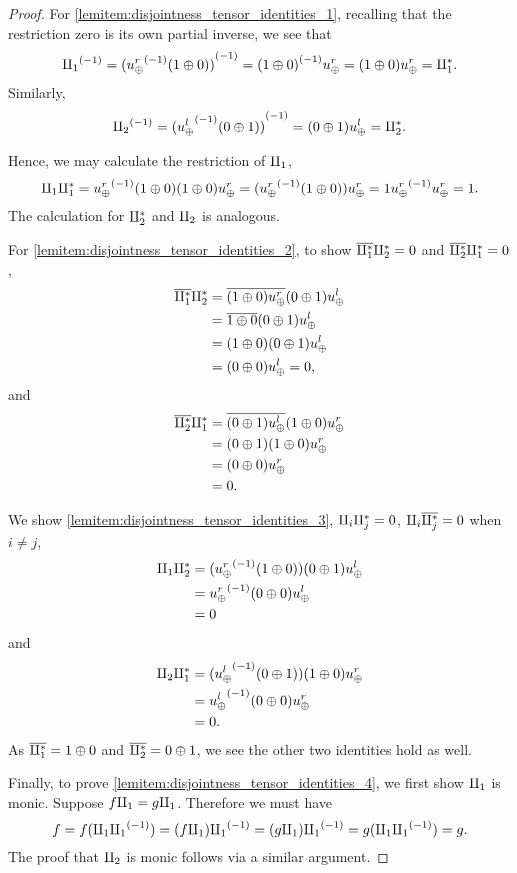 \begin{proof}
  For \ref{lemitem:disjointness_tensor_identities_1}, recalling that the restriction zero is its own
  partial inverse, we see that
  \[
    {\amalg_{1}}^{(-1)} = {({u_{\oplus}^r}^{(-1)}(1\oplus0))}^{(-1)}  = {(1\oplus0)}^{(-1)}u_{\oplus}^r = (1\oplus0)u_{\oplus}^r = \amalg_{1}^{*}.
  \]
  Similarly,
  \[
    {\amalg_{2}}^{(-1)} = {({u_{\oplus}^l}^{(-1)}(0\oplus1))}^{(-1)} = (0\oplus1)u_{\oplus}^l = \amalg_{2}^{*}.
  \]

  Hence, we may calculate the restriction of $\amalg_{1}$,
  \begin{equation*}
    \amalg_{1} \amalg_{1}^{*}   = {u_{\oplus}^r}^{(-1)}(1\oplus0) (1\oplus0)u_{\oplus}^r
      = ({u_{\oplus}^r}^{(-1)}(1\oplus0))u_{\oplus}^r = 1 {u_{\oplus}^r}^{(-1)}u_{\oplus}^r= 1.
  \end{equation*}
  The calculation for $\amalg_{2}^{*}$ and $\amalg_{2}$ is analogous.

  For \ref{lemitem:disjointness_tensor_identities_2}, to show $\overline{\amalg_{1}^{*}} \amalg_{2}^{*} = 0$ and
  $\overline{\amalg_{2}^{*}} \amalg_{1}^{*} = 0$,
  \begin{align*}
    \overline{\amalg_{1}^{*}} \amalg_{2}^{*}  &= \overline{(1\oplus0)u_{\oplus}^r}(0\oplus1)u_{\oplus}^l\\
      &= \overline{1\oplus0} (0 \oplus 1)u_{\oplus}^l\\
      &= (1\oplus0) (0\oplus1)u_{\oplus}^l\\
      &= (0\oplus0)u_{\oplus}^l  = 0,
  \end{align*}
  and
  \begin{align*}
    \overline{\amalg_{2}^{*}} \amalg_{1}^{*}  &= \overline{(0\oplus1)u_{\oplus}^l}(1\oplus0)u_{\oplus}^r \\
     &= (0\oplus1) (1\oplus0)u_{\oplus}^r\\
     &= (0\oplus0)u_{\oplus}^r\\
     &= 0.
 \end{align*}

  We show \ref{lemitem:disjointness_tensor_identities_3}, $\amalg_{i} \amalg_{j}^{*} = 0$, $\amalg_{i}
  \overline{\amalg_{j}^{*}} = 0$ when $i\ne j$,
  \begin{align*}
    \amalg_{1} \amalg_{2}^{*} &= ({u_{\oplus}^r}^{(-1)}(1\oplus0))(0\oplus1) u_{\oplus}^l\\
       &= {u_{\oplus}^r}^{(-1)}(0\oplus0)u_{\oplus}^l\\
       &= 0
  \end{align*}
  and
  \begin{align*}
    \amalg_{2} \amalg_{1}^{*} &= ({u_{\oplus}^l}^{(-1)}(0\oplus1))(1\oplus0) u_{\oplus}^r\\
      &= {u_{\oplus}^l}^{(-1)}(0\oplus0)u_{\oplus}^r\\
       &= 0.
  \end{align*}
  As $\overline{\amalg_{1}^{*}} = 1\oplus0$ and $\overline{\amalg_{2}^{*}} = 0 \oplus1$, we see the other two identities hold as well.

  Finally, to prove \ref{lemitem:disjointness_tensor_identities_4}, we first show $\amalg_{1}$ is
  monic. Suppose $f\amalg_{1} = g\amalg_{1}$. Therefore we must have
  \[
    f = f (\amalg_{1} {\amalg_{1}}^{(-1)}) = (f \amalg_{1}) {\amalg_{1}}^{(-1)} = (g \amalg_{1}) {\amalg_{1}}^{(-1)} = g (\amalg_{1} {\amalg_{1}}^{(-1)}) = g.
  \]
  The proof that $\amalg_{2}$ is monic follows via a similar argument.
\end{proof}

